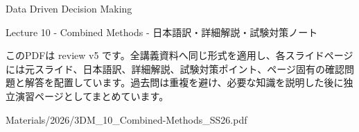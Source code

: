 \documentclass[a4paper,landscape,9pt]{article}
\begin{document}
\begin{titlepage}
\centering
\vspace*{2cm}
{\Huge Data Driven Decision Making\par}
\vspace{0.5cm}
{\Large Lecture 10 - Combined Methods - 日本語訳・詳細解説・試験対策ノート\par}
\vspace{1cm}
\begin{minipage}{0.82\textwidth}
このPDFは review v5 です。全講義資料へ同じ形式を適用し、各スライドページには元スライド、日本語訳、詳細解説、試験対策ポイント、ページ固有の確認問題と解答を配置しています。過去問は重複を避け、必要な知識を説明した後に独立演習ページとしてまとめています。
\end{minipage}
\vfill
{\large Materials/2026/3DM\_10\_Combined-Methods\_SS26.pdf}
\end{titlepage}
\tableofcontents
\clearpage

\end{document}
